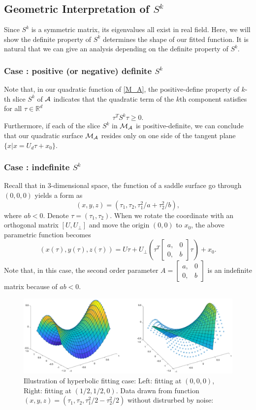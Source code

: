 \documentclass[aos,preprint]{imsart}
\theoremstyle{remark}
\begin{document}
\subsection{Geometric Interpretation of $S^k$}
Since $S^k$ is a symmetric matrix, its eigenvalues all exist in real field. Here, we will show the definite property of $S^k$ determines the shape of our fitted function.  It is natural that we can give an analysis depending on the definite property of $S^k$.
\subsubsection*{Case : positive (or negative) definite $S^k$}
Note that, in our quadratic function of \eqref{M_A},  the positive-define property of $k$-th slice $S^k$ of $\cal A$ indicates that the quadratic term of the $k$th component satisfies for all $\tau\in {\mathbb R}^d$
\[
\tau^T S^k\tau \geq 0.
\]
Furthermore, if each of the slice $S^k$ in $\cal M_A$ is positive-definite, we can conclude that our quadratic surface ${\cal M_A}$ resides only on one side of the tangent plane $\{x|x=U_d\tau+x_0\}$.
\subsubsection*{Case : indefinite $S^k$}

Recall that in 3-dimensional space, the function of a saddle surface go through $(0,0,0)$ yields a form as
\[
(x,y,z) =( \tau_1, \tau_2, {\tau_1^2}/{a}+{\tau_2^2}/{b}),
\]
where $ab<0$. Denote $\tau = (\tau_1,\tau_2)$. When we rotate the coordinate with an orthogonal matrix $[U,U_\perp]$ and move the origin $(0,0)$ to $x_0$, the above parametric function becomes
\[
 (x(\tau),y(\tau),z(\tau)) = U\tau+U_\perp (\tau^T 
 \left[
 \begin{array}{cc}
 a,&0\\
 0,&b
 \end{array}
 \right]
 \tau)
 +x_0.
\]
Note that, in this case, the second order parameter $A =  \left[
 \begin{array}{cc}
 a,&0\\
 0,&b
 \end{array}
 \right]$ is an indefinite matrix because of $ab<0$. 
 
\begin{figure}[t] %
   \centering
   \includegraphics[width=\linewidth]{saddle.eps} 
   \caption{Illustration of hyperbolic  fitting case: Left: fitting at $(0,0,0)$, Right: fitting at $(1/2,1/2,0)$. Data drawn from function $(x,y,z) = (\tau_1,\tau_2, {\tau_1^2}/{2}-{\tau_2^2}/{2})$ without distrurbed by noise:  }
   \label{fig:example}
\end{figure}
 
\end{document}
